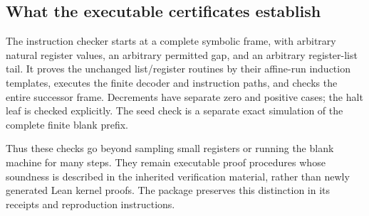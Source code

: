 \subsection{What the executable certificates establish}
The instruction checker starts at a complete symbolic frame, with arbitrary natural register values, an arbitrary permitted gap, and an arbitrary register-list tail. It proves the unchanged list/register routines by their affine-run induction templates, executes the finite decoder and instruction paths, and checks the entire successor frame. Decrements have separate zero and positive cases; the halt leaf is checked explicitly. The seed check is a separate exact simulation of the complete finite blank prefix.

Thus these checks go beyond sampling small registers or running the blank machine for many steps. They remain executable proof procedures whose soundness is described in the inherited verification material, rather than newly generated Lean kernel proofs. The package preserves this distinction in its receipts and reproduction instructions.
